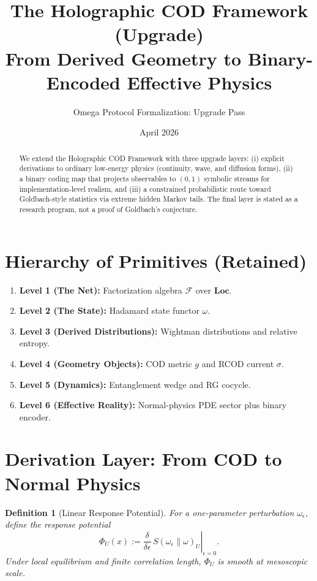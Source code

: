 \documentclass[11pt, a4paper]{article}
\title{The Holographic COD Framework (Upgrade)\\
From Derived Geometry to Binary-Encoded Effective Physics}
\author{Omega Protocol Formalization: Upgrade Pass}
\date{April 2026}
\newtheorem{definition}{Definition}
\begin{document}
\maketitle

\begin{abstract}
We extend the Holographic COD Framework with three upgrade layers: (i) explicit derivations to ordinary low-energy physics (continuity, wave, and diffusion forms), (ii) a binary coding map that projects observables to $(0,1)$ symbolic streams for implementation-level realism, and (iii) a constrained probabilistic route toward Goldbach-style statistics via extreme hidden Markov tails. The final layer is stated as a research program, not a proof of Goldbach's conjecture.
\end{abstract}

\section{Hierarchy of Primitives (Retained)}
\begin{enumerate}
    \item \textbf{Level 1 (The Net):} Factorization algebra $\mathcal{F}$ over $\mathbf{Loc}$.
    \item \textbf{Level 2 (The State):} Hadamard state functor $\omega$.
    \item \textbf{Level 3 (Derived Distributions):} Wightman distributions and relative entropy.
    \item \textbf{Level 4 (Geometry Objects):} COD metric $g$ and RCOD current $\sigma$.
    \item \textbf{Level 5 (Dynamics):} Entanglement wedge and RG cocycle.
    \item \textbf{Level 6 (Effective Reality):} Normal-physics PDE sector plus binary encoder.
\end{enumerate}

\section{Derivation Layer: From COD to Normal Physics}

\begin{definition}[Linear Response Potential]
For a one-parameter perturbation $\omega_\epsilon$, define the response potential
\begin{equation}
\Phi_U(x) := \left.\frac{\delta}{\delta \epsilon}\, S(\omega_\epsilon\|\omega)_U\right|_{\epsilon=0}.
\end{equation}
Under local equilibrium and finite correlation length, $\Phi_U$ is smooth at mesoscopic scale.
\end{definition}
\end{document}
